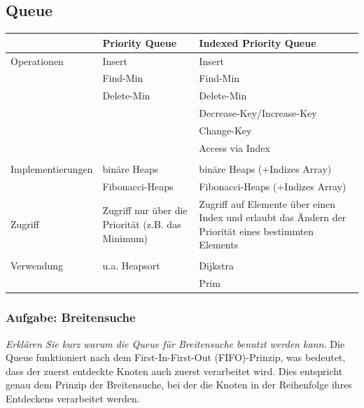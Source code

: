 \documentclass{article}
\begin{document}
\subsection{Queue} 
\begin{vsbox}[title=Unterschied zwischen Indexed Priority Queue und Priority Queue\index{Queue!Priority}]
 \begin{table}[H]
     \centering
     \begin{tabular}{p{3.5cm} | p{5cm} p{5cm}}
          & Priority Queue\index{Queue!Priority} & Indexed Priority Queue\index{Queue!Priority!Indexed} \\ \hline
         Operationen & Insert & Insert \\
         & Find-Min & Find-Min  \\
         & Delete-Min & Delete-Min \\ 
         & & Decrease-Key/Increase-Key   \\
         & & Change-Key \\ 
         & & Access via Index \\ \\
         Implementierungen & binäre Heaps & binäre Heaps (+Indizes Array) \\
         & Fibonacci-Heaps & Fibonacci-Heaps (+Indizes Array) \\
         Zugriff & Zugriff nur über die Priorität (z.B. das Minimum) & Zugriff auf Elemente über einen Index und erlaubt das Ändern der Priorität eines bestimmten Elements \\  \\
         Verwendung & u.a. Heapsort\index{Heapsort} & Dijkstra \index{Dijkstra}\\
          & & Prim \index{Prim} \\
     \end{tabular}
     \label{tab:Unterschied}
 \end{table}
\end{vsbox} 

\newpage
\subsubsection{Aufgabe: Breitensuche \textcolor{ForestGreen}{\CheckmarkBold}} 
\textit{Erklären Sie kurz warum die Queue  für Breitensuche benutzt werden kann.} \cite{probeklausur21} \cite{probeklausur24}
\newline \newline
Die Queue funktioniert nach dem First-In-First-Out (FIFO)-Prinzip, was bedeutet, dass der zuerst entdeckte Knoten auch zuerst verarbeitet wird. Dies entspricht genau dem Prinzip der Breitensuche, bei der die Knoten in der Reihenfolge ihres Entdeckens verarbeitet werden.
\newpage
\end{document}
